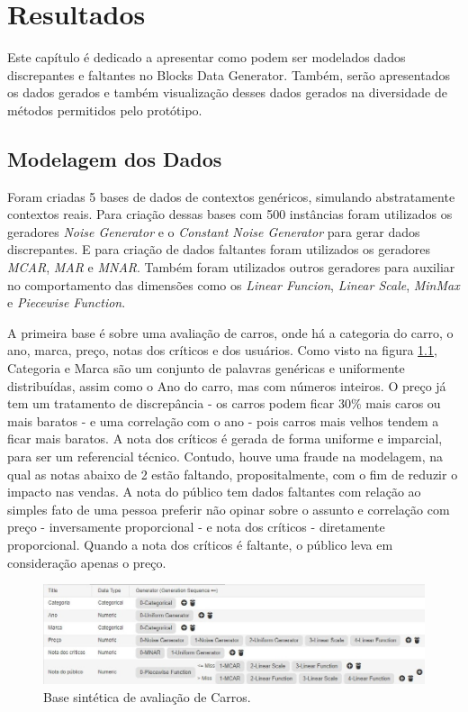 \documentclass[
	12pt,				%
	openright,			%
	twoside,			%
	a4paper,			%
	english,			%
	brazil				%
	]{abntex2}
\begin{document}
\chapter{Resultados}
	Este capítulo é dedicado a apresentar como podem ser modelados dados discrepantes e faltantes no Blocks Data Generator.
	Também, serão apresentados os dados gerados e também visualização desses dados gerados na diversidade de métodos permitidos pelo protótipo.
	\par
	
	\section{Modelagem dos Dados}

		Foram criadas 5 bases de dados de contextos genéricos, simulando abstratamente contextos reais.
		Para criação dessas bases com 500 instâncias foram utilizados os geradores
		 \emph{Noise Generator} e o \emph{Constant Noise Generator} para gerar dados discrepantes.
		E para criação de dados faltantes foram utilizados os geradores
		 \emph{MCAR}, \emph{MAR} e \emph{MNAR}.
		Também foram utilizados outros geradores para auxiliar no comportamento das dimensões como os
		 \emph{Linear Funcion}, \emph{Linear Scale}, \emph{MinMax} e 
		 \emph{Piecewise Function}.
		\par

		A primeira base é sobre uma avaliação de carros, onde há a categoria do carro, o ano, marca, preço, notas dos críticos e dos usuários.
		Como visto na figura \ref{fig:CarrosModelo}, Categoria e Marca são um conjunto de palavras genéricas e uniformente distribuídas, assim como o Ano do carro, mas com números inteiros.
		O preço já tem um tratamento de discrepância - os carros podem ficar 30\% mais caros ou mais baratos - e uma correlação com o ano - pois carros mais velhos tendem a ficar mais baratos.
		A nota dos críticos é gerada de forma uniforme e imparcial, para ser um referencial técnico.
		Contudo, houve uma fraude na modelagem, na qual as notas abaixo de 2 estão faltando, propositalmente, com o fim de reduzir o impacto nas vendas.
		A nota do público tem dados faltantes com relação ao simples fato de uma pessoa preferir não opinar sobre o assunto e correlação com preço - inversamente proporcional - e nota dos críticos - diretamente proporcional.
		Quando a nota dos críticos é faltante, o público leva em consideração apenas o preço.
		\par
		\begin{figure}[h!]
			\centering
			\includegraphics[width=\linewidth]{./figures/Resultados/CarrosModelo.jpg}
			\caption{Base sintética de avaliação de Carros.}
			\label{fig:CarrosModelo}
		\end{figure}
\end{document}
